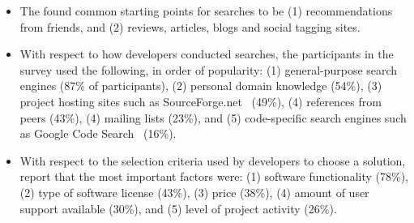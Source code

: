 \documentclass[review]{elsarticle}
\begin{document}
\begin{itemize}


\item The found common starting points for searches to be (1) recommendations from friends, and (2) reviews, articles, blogs and social tagging sites.

\item With respect to how developers conducted searches, the participants in the survey used the following, in order of popularity: (1) general-purpose search engines (87\% of participants), (2) personal domain knowledge (54\%), (3) project hosting sites such as SourceForge.net~\citep{sourceforge_1999} (49\%), (4) references from peers (43\%), (4) mailing lists (23\%), and (5) code-specific search engines such as Google Code Search~\citep{googlecodesearch_2006} (16\%).

\item With respect to the selection criteria used by developers to choose a solution, \citet{umarji_2013} report that the most important factors were: (1) software functionality (78\%), (2) type of software license (43\%), (3) price (38\%), (4) amount of user support available (30\%), and (5) level of project activity (26\%).

\end{itemize}
\end{document}
